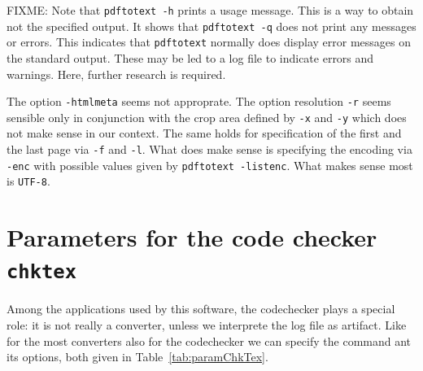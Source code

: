 




FIXME\@: 
Note that \texttt{pdftotext -h} prints a usage message. 
This is a way to obtain not the specified output. 
It shows that \texttt{pdftotext -q} does not print any messages or errors. 
This indicates that \texttt{pdftotext} normally does display error messages 
on the standard output. 
These may be led to a log file to indicate errors and warnings. 
Here, further research is required. 

The option \texttt{-htmlmeta} seems not approprate. 
The option resolution \texttt{-r} seems sensible only in conjunction 
with the crop area defined by \texttt{-x} and \texttt{-y} 
which does not make sense in our context. 
The same holds for specification of the first and the last page 
via \texttt{-f} and \texttt{-l}. 
What does make sense is specifying the encoding via \texttt{-enc} 
with possible values given by \texttt{pdftotext -listenc}. 
What makes sense most is \texttt{UTF-8}. 




\section{Parameters for the code checker \texttt{chktex}}\label{sec:chkTex}

Among the applications used by this software, 
the codechecker plays a special role: 
it is not really a converter, 
unless we interprete the log file as artifact. 
Like for the most converters also for the codechecker 
we can specify the command ant its options, both given in Table~\ref{tab:paramChkTex}. 

